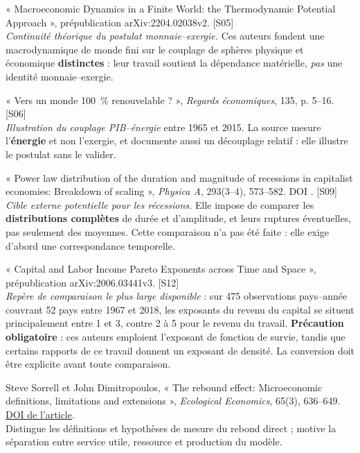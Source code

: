 \begin{description}[leftmargin=1.6em,style=nextline,itemsep=0.35em]
\item[Herbert, Giraud, Louis-Napoléon et Goupil (2022)] « Macroeconomic
  Dynamics in a Finite World: the Thermodynamic Potential Approach »,
  prépublication arXiv:2204.02038v2. \textsf{[S05]}\\
  \emph{Continuité théorique du postulat monnaie--exergie.} Ces auteurs fondent
  une macrodynamique de monde fini sur le couplage de sphères physique et
  économique \textbf{distinctes} : leur travail soutient la dépendance
  matérielle, \emph{pas} une identité monnaie--exergie.

\item[Dupont, Jeanmart et Possoz (2017)] « Vers un monde 100~\% renouvelable ? »,
  \emph{Regards économiques}, 135, p. 5--16. \textsf{[S06]}\\
  \emph{Illustration du couplage PIB--énergie} entre 1965 et 2015. La source
  mesure l'\textbf{énergie} et non l'exergie, et documente aussi un découplage
  relatif : elle illustre le postulat sans le valider.

\item[Ormerod et Mounfield (2001)] « Power law distribution of the duration and
  magnitude of recessions in capitalist economies: Breakdown of scaling »,
  \emph{Physica A}, 293(3--4), 573--582. DOI
  . \textsf{[S09]}\\
  \emph{Cible externe potentielle pour les récessions.} Elle impose de comparer
  les \textbf{distributions complètes} de durée et d'amplitude, et leurs
  ruptures éventuelles, pas seulement des moyennes. Cette comparaison n'a pas
  été faite : elle exige d'abord une correspondance temporelle.

\item[de Vries et Toda (2021)] « Capital and Labor Income Pareto Exponents
  across Time and Space », prépublication arXiv:2006.03441v3. \textsf{[S12]}\\
  \emph{Repère de comparaison le plus large disponible} : sur 475 observations
  pays--année couvrant 52 pays entre 1967 et 2018, les exposants du revenu du
  capital se situent principalement entre 1 et 3, contre 2 à 5 pour le revenu
  du travail. \textbf{Précaution obligatoire} : ces auteurs emploient
  l'exposant de fonction de survie, tandis que certains rapports de ce travail
  donnent un exposant de densité. La conversion doit être explicite avant toute
  comparaison.

\item[Sorrell et Dimitropoulos (2008)] Steve Sorrell et John Dimitropoulos,
  « The rebound effect: Microeconomic definitions, limitations and extensions »,
  \emph{Ecological Economics}, 65(3), 636--649.
  \href{https://doi.org/10.1016/j.ecolecon.2007.08.013}{DOI de l'article}.\\
  Distingue les définitions et hypothèses de mesure du rebond direct ;
  motive la séparation entre service utile, ressource et production du modèle.


\end{description}

